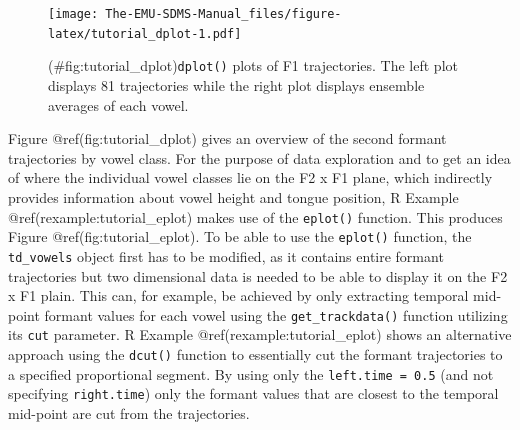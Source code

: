 \documentclass[]{book}
\newenvironment{Shaded}{\begin{snugshade}}{\end{snugshade}}
\newcommand{\KeywordTok}[1]{\textcolor[rgb]{0.13,0.29,0.53}{\textbf{{#1}}}}
\newcommand{\DataTypeTok}[1]{\textcolor[rgb]{0.13,0.29,0.53}{{#1}}}
\newcommand{\DecValTok}[1]{\textcolor[rgb]{0.00,0.00,0.81}{{#1}}}
\newcommand{\FloatTok}[1]{\textcolor[rgb]{0.00,0.00,0.81}{{#1}}}
\newcommand{\StringTok}[1]{\textcolor[rgb]{0.31,0.60,0.02}{{#1}}}
\newcommand{\CommentTok}[1]{\textcolor[rgb]{0.56,0.35,0.01}{\textit{{#1}}}}
\newcommand{\OtherTok}[1]{\textcolor[rgb]{0.56,0.35,0.01}{{#1}}}
\newcommand{\NormalTok}[1]{{#1}}
\theoremstyle{definition}
\theoremstyle{definition}
\theoremstyle{definition}
\theoremstyle{remark}
\begin{document}
\begin{figure}
\centering
\texttt{[image: The-EMU-SDMS-Manual\_files/figure-latex/tutorial\_dplot-1.pdf]}
\caption{(\#fig:tutorial\_dplot)\texttt{dplot()} plots of F1
trajectories. The left plot displays 81 trajectories while the right
plot displays ensemble averages of each vowel.}
\end{figure}

Figure @ref(fig:tutorial\_dplot) gives an overview of the second formant
trajectories by vowel class. For the purpose of data exploration and to
get an idea of where the individual vowel classes lie on the F2 x F1
plane, which indirectly provides information about vowel height and
tongue position, R Example @ref(rexample:tutorial\_eplot) makes use of
the \texttt{eplot()} function. This produces Figure
@ref(fig:tutorial\_eplot). To be able to use the \texttt{eplot()}
function, the \texttt{td\_vowels} object first has to be modified, as it
contains entire formant trajectories but two dimensional data is needed
to be able to display it on the F2 x F1 plain. This can, for example, be
achieved by only extracting temporal mid-point formant values for each
vowel using the \texttt{get\_trackdata()} function utilizing its
\texttt{cut} parameter. R Example @ref(rexample:tutorial\_eplot) shows
an alternative approach using the \texttt{dcut()} function to
essentially cut the formant trajectories to a specified proportional
segment. By using only the \texttt{left.time\ =\ 0.5} (and not
specifying \texttt{right.time}) only the formant values that are closest
to the temporal mid-point are cut from the trajectories.

\begin{Shaded}
\end{Shaded}
\end{document}
